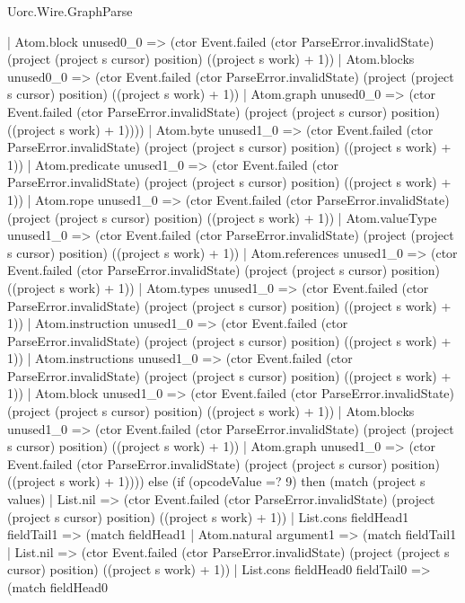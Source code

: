 \begin{lexlean}{Uorc.Wire.GraphParse}
\begin{semanticmodule}
{              | Atom.block unused0_0 => (ctor Event.failed (ctor ParseError.invalidState) (project (project s cursor) position) ((project s work) + 1))
              | Atom.blocks unused0_0 => (ctor Event.failed (ctor ParseError.invalidState) (project (project s cursor) position) ((project s work) + 1))
              | Atom.graph unused0_0 => (ctor Event.failed (ctor ParseError.invalidState) (project (project s cursor) position) ((project s work) + 1))))
          | Atom.byte unused1_0 => (ctor Event.failed (ctor ParseError.invalidState) (project (project s cursor) position) ((project s work) + 1))
          | Atom.predicate unused1_0 => (ctor Event.failed (ctor ParseError.invalidState) (project (project s cursor) position) ((project s work) + 1))
          | Atom.rope unused1_0 => (ctor Event.failed (ctor ParseError.invalidState) (project (project s cursor) position) ((project s work) + 1))
          | Atom.valueType unused1_0 => (ctor Event.failed (ctor ParseError.invalidState) (project (project s cursor) position) ((project s work) + 1))
          | Atom.references unused1_0 => (ctor Event.failed (ctor ParseError.invalidState) (project (project s cursor) position) ((project s work) + 1))
          | Atom.types unused1_0 => (ctor Event.failed (ctor ParseError.invalidState) (project (project s cursor) position) ((project s work) + 1))
          | Atom.instruction unused1_0 => (ctor Event.failed (ctor ParseError.invalidState) (project (project s cursor) position) ((project s work) + 1))
          | Atom.instructions unused1_0 => (ctor Event.failed (ctor ParseError.invalidState) (project (project s cursor) position) ((project s work) + 1))
          | Atom.block unused1_0 => (ctor Event.failed (ctor ParseError.invalidState) (project (project s cursor) position) ((project s work) + 1))
          | Atom.blocks unused1_0 => (ctor Event.failed (ctor ParseError.invalidState) (project (project s cursor) position) ((project s work) + 1))
          | Atom.graph unused1_0 => (ctor Event.failed (ctor ParseError.invalidState) (project (project s cursor) position) ((project s work) + 1)))) else (if (opcodeValue =? 9) then (match (project s values)
        | List.nil => (ctor Event.failed (ctor ParseError.invalidState) (project (project s cursor) position) ((project s work) + 1))
        | List.cons fieldHead1 fieldTail1 => (match fieldHead1
          | Atom.natural argument1 => (match fieldTail1
            | List.nil => (ctor Event.failed (ctor ParseError.invalidState) (project (project s cursor) position) ((project s work) + 1))
            | List.cons fieldHead0 fieldTail0 => (match fieldHead0
}
\end{semanticmodule}
\end{lexlean}
